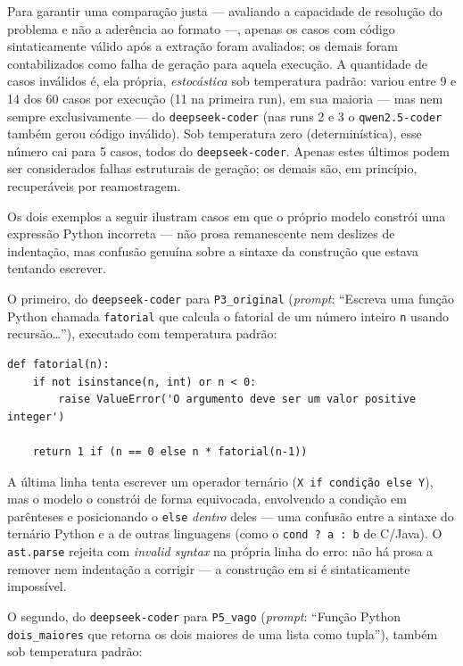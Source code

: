 \documentclass[12pt,
    english,
    french,
    spanish,
    brazil,
    ]{article}
\begin{document}
Para garantir uma comparação justa — avaliando a capacidade de
resolução do problema e não a aderência ao formato —, apenas os casos
com código sintaticamente válido após a extração foram avaliados; os
demais foram contabilizados como falha de geração para aquela execução.
A quantidade de casos inválidos é, ela própria, \textit{estocástica}
sob temperatura padrão: variou entre 9 e 14 dos 60 casos por execução
(11 na primeira run), em sua maioria — mas nem sempre exclusivamente —
do \texttt{deepseek-coder} (nas runs 2 e 3 o \texttt{qwen2.5-coder}
também gerou código inválido). Sob temperatura zero (determinística),
esse número cai para 5 casos, todos do \texttt{deepseek-coder}. Apenas
estes últimos podem ser considerados falhas estruturais de geração; os
demais são, em princípio, recuperáveis por reamostragem.

Os dois exemplos a seguir ilustram casos em que o próprio modelo
constrói uma expressão Python incorreta — não prosa remanescente nem
deslizes de indentação, mas confusão genuína sobre a sintaxe da
construção que estava tentando escrever.

O primeiro, do \texttt{deepseek-coder} para \texttt{P3\_original}
(\textit{prompt}: ``Escreva uma função Python chamada \texttt{fatorial}
que calcula o fatorial de um número inteiro \texttt{n} usando
recursão\dots''), executado com temperatura padrão:

\begin{lstlisting}[style=python, caption={deepseek-coder em P3\_original — operador ternário malformado}]
def fatorial(n):
    if not isinstance(n, int) or n < 0:
        raise ValueError('O argumento deve ser um valor positive integer')

    return 1 if (n == 0 else n * fatorial(n-1))
\end{lstlisting}

A última linha tenta escrever um operador ternário (\texttt{X if
condição else Y}), mas o modelo o constrói de forma equivocada,
envolvendo a condição em parênteses e posicionando o \texttt{else}
\textit{dentro} deles — uma confusão entre a sintaxe do ternário Python
e a de outras linguagens (como o \texttt{cond ? a : b} de C/Java). O
\texttt{ast.parse} rejeita com \textit{invalid syntax} na própria linha
do erro: não há prosa a remover nem indentação a corrigir — a
construção em si é sintaticamente impossível.

O segundo, do \texttt{deepseek-coder} para \texttt{P5\_vago}
(\textit{prompt}: ``Função Python \texttt{dois\_maiores} que retorna os
dois maiores de uma lista como tupla''), também sob temperatura padrão:
\end{document}
